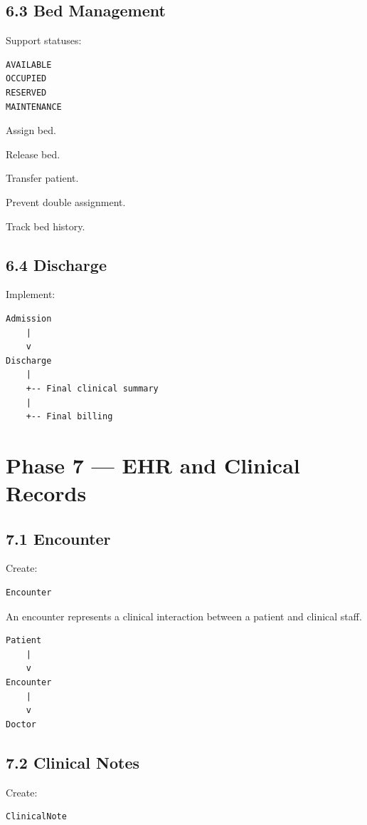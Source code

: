 \documentclass[11pt,a4paper]{article}
\newcommand{\task}[1]{\item[$\square$] #1}
\begin{document}
\subsection{6.3 Bed Management}

Support statuses:

\begin{lstlisting}
AVAILABLE
OCCUPIED
RESERVED
MAINTENANCE
\end{lstlisting}

\task{Assign bed.}
\task{Release bed.}
\task{Transfer patient.}
\task{Prevent double assignment.}
\task{Track bed history.}

\subsection{6.4 Discharge}

Implement:

\begin{lstlisting}
Admission
    |
    v
Discharge
    |
    +-- Final clinical summary
    |
    +-- Final billing
\end{lstlisting}

\section{Phase 7 --- EHR and Clinical Records}

\subsection{7.1 Encounter}

Create:

\begin{lstlisting}
Encounter
\end{lstlisting}

An encounter represents a clinical interaction between a patient and
clinical staff.

\begin{lstlisting}
Patient
    |
    v
Encounter
    |
    v
Doctor
\end{lstlisting}

\subsection{7.2 Clinical Notes}

Create:

\begin{lstlisting}
ClinicalNote
\end{lstlisting}
\end{document}
